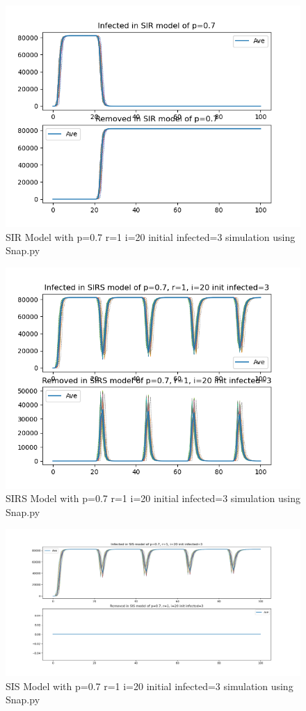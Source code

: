 \documentclass{subfile}
\begin{document}
  \begin{figure}
  \includegraphics[scale=0.8]{sirp07r1i20s3}
  \caption[SIR p=0.7,r=1,i=20,init infected=3]{SIR Model with p=0.7 r=1 i=20 initial infected=3 simulation using Snap.py}
  \end{figure}
  \begin{figure}
  \includegraphics[scale=0.8]{sirsp07r1i20s3}
  \caption[SIRS p=0.7,r=1,i=20,init infected=3]{SIRS Model with p=0.7 r=1 i=20 initial infected=3 simulation using Snap.py}
  \end{figure}
  \begin{figure}
  \includegraphics[scale=0.5]{sisp07r1i20s3}
  \caption[SIS p=0.7,r=1,i=20,init infected=3]{SIS Model with p=0.7 r=1 i=20 initial infected=3 simulation using Snap.py}
  \end{figure}

  \clearpage
\end{document}
